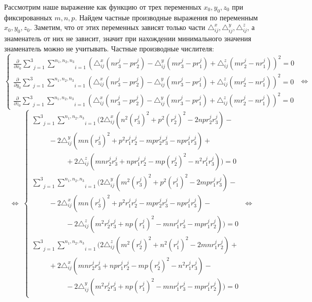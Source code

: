 Рассмотрим наше выражение как функцию от трех переменных $x_0, y_0, z_0$ при фиксированных $m, n, p$. Найдем частные производные выражения по переменным $x_0, y_0, z_0$. Заметим, что от этих переменных зависят только части $\triangle_{ij}^x, \triangle_{ij}^y, \triangle_{ij}^z$, а знаменатель от них не зависит, значит при нахождении минимального значения знаменатель можно не учитывать. Частные производные числителя:
$$\begin{cases}
	\frac{\partial}{\partial x_0} \underset{j=1}{\overset{3}{\sum}} \underset{i=1}{\overset{n_1, n_2, n_3}{\sum}} \left(\triangle_{ij}^x (n r_3^j - p r_2^j) - \triangle_{ij}^y (m r_3^j - p r_1^j) + \triangle_{ij}^z (m r_2^j - n r_1^j)\right)^2 = 0 \\
	\frac{\partial}{\partial y_0} \underset{j=1}{\overset{3}{\sum}} \underset{i=1}{\overset{n_1, n_2, n_3}{\sum}} \left(\triangle_{ij}^x (n r_3^j - p r_2^j) - \triangle_{ij}^y (m r_3^j - p r_1^j) + \triangle_{ij}^z (m r_2^j - n r_1^j)\right)^2 = 0 \\
	\frac{\partial}{\partial z_0} \underset{j=1}{\overset{3}{\sum}} \underset{i=1}{\overset{n_1, n_2, n_3}{\sum}} \left(\triangle_{ij}^x (n r_3^j - p r_2^j) - \triangle_{ij}^y (m r_3^j - p r_1^j) + \triangle_{ij}^z (m r_2^j - n r_1^j)\right)^2 = 0
\end{cases} \; \Leftrightarrow $$
\hfill \break \hfill \break \hfill \break
$$ \Leftrightarrow \; \begin{cases}
	\underset{j=1}{\overset{3}{\sum}} \underset{i=1}{\overset{n_1, n_2, n_3}{\sum}} \Bigg( 2 \triangle_{ij}^x (n^2 (r_3^j)^2 + p^2 (r_2^j)^2 - 2 n p r_2^j r_3^j) - \\
	\hspace{1cm} - 2 \triangle_{ij}^y (m n (r_3^j)^2 + p^2 r_1^j r_2^j - m p r_2^j r_3^j - n p r_1^j r_3^j) + \\
	\hspace{2cm} + 2 \triangle_{ij}^z (m n r_2^j r_3^j + n p r_1^j r_2^j - m p (r_2^j)^2 - n^2 r_1^j r_3^j) \Bigg)= 0 \\
	\underset{j=1}{\overset{3}{\sum}} \underset{i=1}{\overset{n_1, n_2, n_3}{\sum}} \Bigg( 2 \triangle_{ij}^y (m^2 (r_3^j)^2 + p^2 (r_1^j)^2 - 2 m p r_1^j r_3^j) - \\
	\hspace{1cm} - 2 \triangle_{ij}^x (m n (r_3^j)^2 + p^2 r_1^j r_2^j - m p r_2^j r_3^j - n p r_1^j r_3^j) - \\
	\hspace{2cm} - 2 \triangle_{ij}^z (m^2 r_2^j r_3^j + n p (r_1^j)^2 - m n r_1^j r_3^j - m p r_1^j r_2^j) \Bigg) = 0 \\
	\underset{j=1}{\overset{3}{\sum}} \underset{i=1}{\overset{n_1, n_2, n_3}{\sum}} \Bigg( 2 \triangle_{ij}^z (m^2 (r_2^j)^2 + n^2 (r_1^j)^2 - 2 m n r_1^j r_2^j) + \\
	\hspace{1cm} + 2 \triangle_{ij}^x (m n r_2^j r_3^j + n p r_1^j r_2^j - m p (r_2^j)^2 - n^2 r_1^j r_3^j) - \\
	\hspace{2cm} - 2 \triangle_{ij}^y (m^2 r_2^j r_3^j + n p (r_1^j)^2 - m n r_1^j r_3^j - m p r_1^j r_2^j) \Bigg) = 0
\end{cases} \; \Leftrightarrow$$
